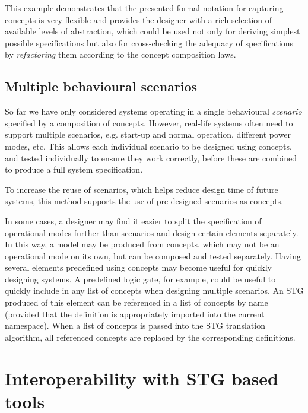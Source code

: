 \documentclass[british, journal]{IEEEtran}
\begin{document}
This example demonstrates that the presented formal notation for capturing
concepts is very flexible and provides the designer with a rich selection
of available levels of abstraction, which could be used not only for
deriving simplest possible specifications but also for cross-checking
the adequacy of specifications by \emph{refactoring} them according
to the concept composition laws.

\vspace{-1mm}
\subsection{Multiple behavioural scenarios\label{sub:scenarios}}

So far we have only considered systems operating in a single behavioural
\textit{scenario} specified by a composition of concepts. However,
real-life systems often need to support multiple scenarios, e.g. start-up
and normal operation, different power modes, etc. This allows
each individual scenario to be designed using concepts,
and tested individually to ensure they work correctly, before these
are combined to produce a full system specification.

To increase the reuse of scenarios, which helps reduce design
time of future systems, this method supports the use of pre-designed
scenarios as concepts.

In some cases, a designer may find it easier to split the specification
of operational modes further than scenarios and design certain elements
separately. In this way, a model may be produced from concepts, which
may not be an operational mode on its own, but can be composed and
tested separately. Having several elements predefined
using concepts may become useful for quickly designing systems. A
predefined logic gate, for example, could be useful to quickly include
in any list of concepts when designing multiple scenarios. An STG
produced of this element can be referenced in a list of concepts by
name (provided that the definition is appropriately imported into
the current namespace). When a list of concepts is passed into the
STG translation algorithm, all referenced concepts are replaced by
the corresponding definitions.

\vspace{-1mm}
\section{Interoperability with STG based tools\label{sec:interop-with-stg}}
\end{document}
